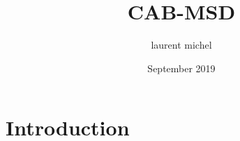 \documentclass{article}
\title{CAB-MSD}
\author{laurent michel}
\date{September 2019}
\begin{document}
\maketitle

\section{Introduction}
\end{document}
